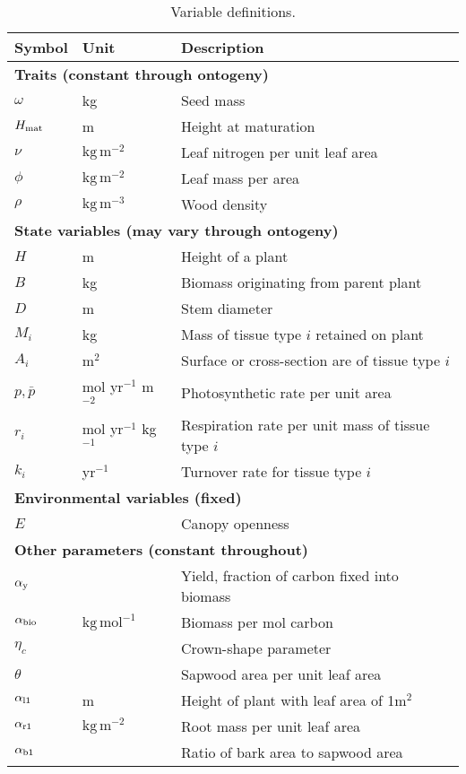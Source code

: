 \documentclass[9pt,twocolumn,twoside,lineno]{pnas-new}
\begin{document}
\begin{table}[!hb]
 \caption{Variable definitions.}
\centering
\begin{tabular}{p{0.5cm}p{1.75cm}p{5cm}}
\toprule
Symbol & Unit & Description \\
\midrule
\multicolumn{3}{l}{\textbf{Traits (constant through ontogeny)}}\\
$\omega$ & kg & Seed mass  \\
$H_{{\rm mat}}$ & m & Height at maturation\\
$\nu$ & $\mathrm{kg}\,\mathrm{m}^{-2}$ & Leaf nitrogen per unit leaf area  \\
$\phi$ & $\mathrm{kg}\,\mathrm{m}^{-2}$ & Leaf mass per area \\
$\rho$ & $\mathrm{kg}\,\mathrm{m}^{-3}$ & Wood density \\
\multicolumn{3}{l}{\textbf{State variables (may vary through ontogeny)}} \\
$H$ & m & Height of a plant\\
$B$ & kg & Biomass originating from parent plant\\
$D$ & m & Stem diameter\\
$M_i$ & kg & Mass of tissue type $i$ retained on plant \\
$A_i$ & m$^2$ & Surface or cross-section are of tissue type $i$\\
$p,\bar{p}$ & mol yr$^{-1}$ m$^{-2}$ & Photosynthetic rate per unit area \\
$r_i$ & mol yr$^{-1}$ kg$^{-1}$  & Respiration rate per unit mass of tissue type $i$ \\
$k_i$ & yr$^{-1}$ & Turnover rate for tissue type $i$ \\
\multicolumn{3}{l}{\textbf{Environmental variables (fixed)}} \\
$E$ & & Canopy openness\\
\multicolumn{3}{l}{\textbf{Other parameters (constant throughout)}} \\
$\alpha_{\rm y}$ &  & Yield, fraction of carbon fixed into biomass\\
$\alpha_{\rm bio}$  & $\mathrm{kg}\,\mathrm{mol}^{-1}$ & Biomass per mol carbon \\
$\eta_c$ & & Crown-shape parameter\\
$\theta$ &  & Sapwood area per unit leaf area\\
$\alpha_{\rm l1}$ & m & Height of plant with leaf area of 1m$^2$ \\
$\alpha_{\rm r1}$ & $\mathrm{kg}\,\mathrm{m}^{-2}$ & Root mass per unit leaf area \\
$\alpha_{\rm b1}$ &  & Ratio of bark area to sapwood area\\
\bottomrule
\end{tabular}
\label{tab:definitions}
\end{table}
\end{document}
